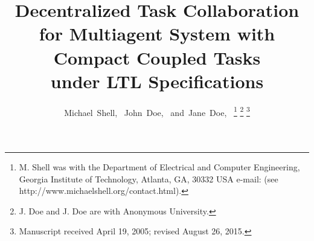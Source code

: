 \documentclass[journal]{IEEEtran}
\begin{document}
%
\title{Decentralized Task Collaboration for Multiagent System with Compact Coupled Tasks\\ under LTL Specifications}
%
%
%

\author{Michael~Shell,~
        John~Doe,~
        and~Jane~Doe,~%
\thanks{M. Shell was with the Department
of Electrical and Computer Engineering, Georgia Institute of Technology, Atlanta,
GA, 30332 USA e-mail: (see http://www.michaelshell.org/contact.html).}%
\thanks{J. Doe and J. Doe are with Anonymous University.}%
\thanks{Manuscript received April 19, 2005; revised August 26, 2015.}}

%
%
\end{document}
